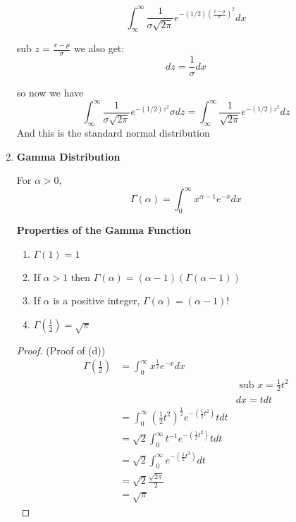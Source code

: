 \documentclass[12pt]{article}
\begin{document}
\begin{enumerate}
{		$$\int^{\infty}_\infty \frac{1}{\sigma \sqrt{2\pi}} e^{-(1/2)(\frac{x - \mu}{\sigma})^2} dx$$
		
		\begin{tcolorbox}
			sub $z = \frac{x - \mu}{\sigma}$ we also get:
			$$dz = \frac{1}{\sigma} dx$$
		\end{tcolorbox}
		
		so now we have 
		$$\int^{\infty}_\infty \frac{1}{\sigma \sqrt{2\pi}} e^{-(1/2)z^2} \sigma dz = \int^{\infty}_\infty \frac{1}{\sqrt{2\pi}} e^{-(1/2)z^2} dz$$
		And this is the standard normal distribution

	}
	\item{
	\textbf{Gamma Distribution}
	
	\begin{tcolorbox}[title=Definition: Gamma Function]
		For $\alpha > 0$, $$\Gamma (\alpha) = \int^\infty_0 x^{\alpha - 1} e^{-x} dx$$
	\end{tcolorbox}

	\textbf{Properties of the Gamma Function}
	\begin{enumerate}
		\item{$\Gamma (1) = 1$}
		\item{If $\alpha > 1$ then $\Gamma (\alpha) = (\alpha - 1)(\Gamma (\alpha - 1))$}
		\item{If $\alpha$ is a positive integer, $\Gamma (\alpha) = (\alpha - 1)!$}
		\item{$\Gamma (\frac{1}{2}) = \sqrt{\pi}$}
	\end{enumerate}

	\begin{proof}
		(Proof of (d))\\
		\begin{align*}
			\Gamma (\frac{1}{2}) &= \int^\infty_0 x^{\frac{1}{2}} e^{-x} dx\\
			&& \text{ sub } x = \frac{1}{2}t^2\\
			&& dx = t dt\\
			&= \int^\infty_0 (\frac{1}{2}t^2)^{\frac{1}{2}} e^{-(\frac{1}{2}t^2)} t dt\\
			&= \sqrt{2} \int^\infty_0 t^{-1} e^{-(\frac{1}{2}t^2)} t dt\\
			&= \sqrt{2} \int^\infty_0 e^{-(\frac{1}{2}t^2)} dt\\
			&= \sqrt{2} \frac{\sqrt{2\pi}}{2}\\
			&= \sqrt{\pi}
		\end{align*}

	\end{proof}
	
}
\end{enumerate}
\end{document}

